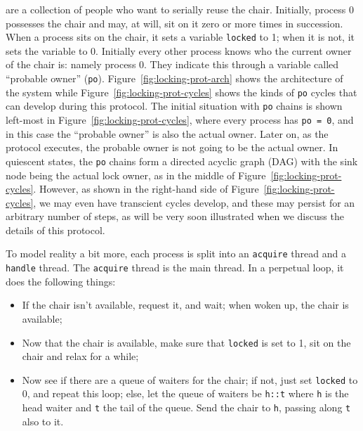 \documentclass[11pt]{article}
\begin{document}
are a collection of people who want to serially reuse the chair.
%
Initially, process 0 possesses the chair and may, at will, sit on it zero
or more times in succession.
%
When a process sits on the chair, it sets a variable {\tt locked} to 1;
when it is not, it sets the variable to 0.
%
Initially every other process knows who the current owner of the chair is: namely
process 0.
%
They indicate this through a variable called ``probable owner'' ({\tt po}).
%
Figure~\ref{fig:locking-prot-arch} shows the architecture of the system
while
Figure~\ref{fig:locking-prot-cycles} shows the kinds of {\tt po} cycles that
can develop during this protocol.
%
The initial situation with {\tt po} chains is shown left-most in 
Figure~\ref{fig:locking-prot-cycles}, where
every process has {\tt po = 0}, and in this case the ``probable owner''
is also the actual owner.
%
Later on, as the protocol executes, the probable owner is not going to be the actual
owner.
%
In quiescent states, the {\tt po} chains form a directed acyclic graph (DAG) with
the sink node being the actual lock owner, as
in the middle of Figure~\ref{fig:locking-prot-cycles}.
%
However, as shown in the right-hand side of
Figure~\ref{fig:locking-prot-cycles}, we may even have transcient cycles develop,
and these may persist for an arbitrary number of steps, as will be very soon
illustrated when we discuss the details of this protocol.

To model reality a bit more, each process is split into an {\tt acquire}
thread and a {\tt handle} thread.
%
The {\tt acquire} thread is the main thread. In a perpetual loop, it
does the following things:
\begin{itemize}
\item If the chair isn't available, request it,
  and wait; when woken up, the chair is available;
\item Now that the chair is
  available, make sure that {\tt locked} is set to 1,
  sit on the chair and relax for a while;
\item Now see if there are a queue of waiters for the chair; if
  not, just set {\tt locked} to 0, and repeat this loop; else,
  let the queue of waiters be {\tt h::t} where {\tt h} is the
  head waiter and {\tt t} the tail of the queue. Send the chair
  to {\tt h}, passing along {\tt t} also to it.
\end{itemize}
\end{document}
